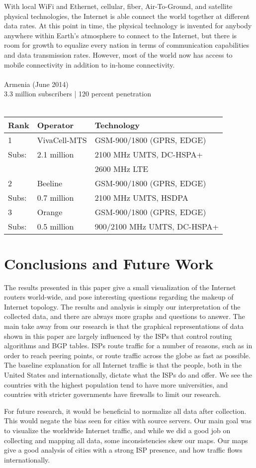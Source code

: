 \documentclass{sigcomm-alternate}
\begin{document}
With local WiFi and Ethernet, cellular, fiber, Air-To-Ground, and satellite physical technologies, the Internet is able connect the world together at different data rates. At this point in time, the physical technology is invented for anybody anywhere within Earth’s atmosphere to connect to the Internet, but there is room for growth to equalize every nation in terms of communication capabilities and data transmission rates. However, most of the world now has access to mobile connectivity in addition to in-home connectivity.
\\\\
Armenia (June 2014) \\
3.3 million subscribers | 120 percent penetration \\\\
\begin{tabular}{ |l|l|l| }
  \hline
  Rank & Operator & Technology\\ \hline
  1 & VivaCell-MTS & GSM-900/1800 (GPRS, EDGE) \\
  Subs: & 2.1 million & 2100 MHz UMTS, DC-HSPA+ \\
  &  & 2600 MHz LTE \\ \hline
  2 & Beeline & GSM-900/1800 (GPRS, EDGE) \\
  Subs: & 0.7 million & 2100 MHz UMTS, HSDPA \\ \hline
  3 & Orange & GSM-900/1800 (GPRS, EDGE) \\
  Subs: & 0.5 million & 900/2100 MHz UMTS, DC-HSPA+ \\ \hline
\end{tabular}


\section{Conclusions and Future Work}
The results presented in this paper give a small visualization of the Internet routers world-wide, and pose interesting questions regarding the makeup of Internet topology. The results and analysis is simply our interpretation of the collected data, and there are always more graphs and questions to answer. The main take away from our research is that the graphical representations of data shown in this paper are largely influenced by the ISPs that control routing algorithms and BGP tables. ISPs route traffic for a number of reasons, such as in order to reach peering points, or route traffic across the globe as fast as possible. The baseline explanation for all Internet traffic is that the people, both in the United States and internationally, dictate what the ISPs do and offer. We see the countries with the highest population tend to have more universities, and countries with stricter governments have firewalls to limit our research.

For future research, it would be beneficial to normalize all data after collection. This would negate the bias seen for cities with source servers. Our main goal was to visualize the worldwide Internet traffic, and while we did a good job on collecting and mapping all data, some inconsistencies skew our maps. Our maps give a good analysis of cities with a strong ISP presence, and how traffic flows internationally. 




\end{document}
